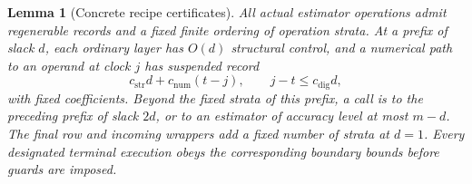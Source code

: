 \documentclass[11pt]{article}
\numberwithin{equation}{section}
\newtheorem{lemma}[theorem]{Lemma}
\theoremstyle{definition}
\theoremstyle{remark}
\begin{document}
\begin{lemma}[Concrete recipe certificates]\label{lem:ctrl-recipes}
All actual estimator operations admit regenerable records and a fixed
finite ordering of operation strata.  At a prefix of slack $d$, each
ordinary layer has $O(d)$ structural control, and a numerical path to an
operand at clock $j$ has suspended record
\begin{equation}\label{eq:ctrl-recipe-bound}
 c_{\mathrm{str}}d+c_{\mathrm{num}}(t-j),\qquad
 j-t\le c_{\mathrm{dig}}d,
\end{equation}
with fixed coefficients.  Beyond the fixed strata of this prefix, a
call is to the preceding prefix of slack $2d$, or to an estimator of
accuracy level at most ${m}-d$.  The final row and incoming wrappers add a fixed
number of strata at $d=1$.  Every designated terminal execution obeys
the corresponding boundary bounds before guards are imposed.
\end{lemma}
\end{document}
